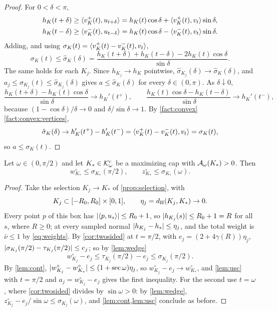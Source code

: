 \begin{proof}
For $0<\delta<\pi$,
\begin{align*}
  h_K(t+\delta)&\ge\langle v_K^+(t),u_{t+\delta}\rangle=h_K(t)\cos\delta
    +\langle v_K^+(t),v_t\rangle\sin\delta,\\
  h_K(t-\delta)&\ge\langle v_K^-(t),u_{t-\delta}\rangle=h_K(t)\cos\delta
    -\langle v_K^-(t),v_t\rangle\sin\delta.
\end{align*}
Adding, and using $\sigma_K(t)=\langle v_K^+(t)-v_K^-(t),v_t\rangle$,
\[
  \sigma_K(t)\le\hat\sigma_K(\delta)
    =\frac{h_K(t+\delta)+h_K(t-\delta)-2h_K(t)\cos\delta}{\sin\delta}.
\]
The same holds for each $K_j$. Since $h_{K_j}\to h_K$ pointwise,
$\hat\sigma_{K_j}(\delta)\to\hat\sigma_K(\delta)$, and
$a_j\le\sigma_{K_j}(t)\le\hat\sigma_{K_j}(\delta)$ gives
$a\le\hat\sigma_K(\delta)$ for every $\delta\in(0,\pi)$. As $\delta\downarrow0$,
\[
  \frac{h_K(t+\delta)-h_K(t)\cos\delta}{\sin\delta}\to h_K'(t^+),\qquad
  \frac{h_K(t)\cos\delta-h_K(t-\delta)}{\sin\delta}\to h_K'(t^-),
\]
because $(1-\cos\delta)/\delta\to0$ and $\delta/\sin\delta\to1$. By
\cref{fact:convex}\ref{fact:convex:vertices},
\[
  \hat\sigma_K(\delta)\to h_K'(t^+)-h_K'(t^-)=\langle v_K^+(t)-v_K^-(t),v_t\rangle
    =\sigma_K(t),
\]
so $a\le\sigma_K(t)$.
\end{proof}

\begin{proposition}\label{prop:pinned-bounds}
Let $\omega\in(0,\pi/2)$ and let $K_*\in\mathcal{K}^{\mathrm{c}}_\omega$ be a maximizing cap with
$\mathcal{A}_\omega(K_*)>0$. Then
\[
  w^\circ_{K_*}\le\sigma_{K_*}(\pi/2),\qquad
  z^\circ_{K_*}\le\sigma_{K_*}(\omega).
\]
\end{proposition}

\begin{proof}
Take the selection $K_j\to K_*$ of \cref{prop:selection}, with
\[
  K_j\subset[-R_0,R_0]\times[0,1],\qquad\eta_j=d_{\mathrm{H}}(K_j,K_*)\to0.
\]
Every point $p$ of this box has $\lvert \langle p,u_s\rangle\rvert\le R_0+1$, so
$\lvert h_{K_j}(s)\rvert\le R_0+1=R$ for all $s$, where $R\ge0$; at every sampled
normal $\lvert h_{K_j}-h_*\rvert\le\eta_j$, and the total weight is $\bar\nu\le1$ by
\eqref{eq:weights}. By \cref{cor:twosided} at $t=\pi/2$, with
$e_j=(2+4\gamma(R))\eta_j$, $\lvert \sigma_{K_j}(\pi/2)-\tau_{K_j}(\pi/2)\rvert\le
e_j$; so by \cref{lem:wedge}
\[
  w^\circ_{K_j}-e_j\le\tau_{K_j}(\pi/2)-e_j\le\sigma_{K_j}(\pi/2).
\]
By \cref{lem:cont}, $\lvert w^\circ_{K_j}-w^\circ_{K_*}\rvert\le(1+\sec\omega)\eta_j$,
so $w^\circ_{K_j}-e_j\to w^\circ_{K_*}$, and \cref{lem:usc} with $t=\pi/2$ and
$a_j=w^\circ_{K_j}-e_j$ gives the first inequality. For the second use
$t=\omega$, where \cref{cor:twosided} divides by $\sin\omega>0$: by
\cref{lem:wedge}, $z^\circ_{K_j}-e_j/\sin\omega\le\sigma_{K_j}(\omega)$, and
\cref{lem:cont,lem:usc} conclude as before.
\end{proof}

